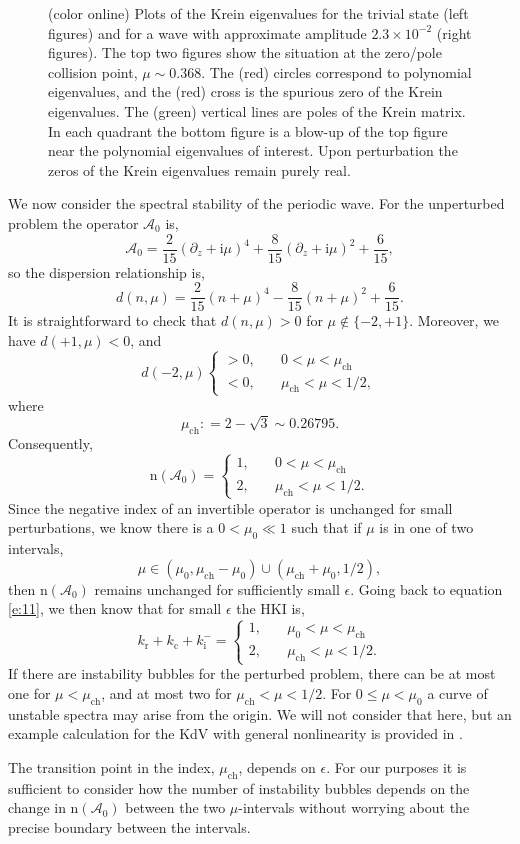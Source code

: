 \documentclass[review,onefignum,onetabnum]{siamart171218}
\def\coloneqq{\mathrel{\mathop:}=}
\newcommand{\rmc}{\mathrm{c}}
\newcommand{\rmi}{\mathrm{i}}
\newcommand{\rmn}{\mathrm{n}}
\newcommand{\rmr}{\mathrm{r}}
\newcommand{\calA}{\mathcal{A}}
\begin{document}
\begin{figure}[ht]
\begin{center}
\begin{tabular}{cc}
\end{tabular}
\caption{(color online) Plots of the Krein eigenvalues for the trivial state (left figures) and for
a wave with approximate amplitude $2.3\times10^{-2}$ (right figures). The top two figures show the
situation at the zero/pole collision
point, $\mu\sim0.368$. The (red) circles correspond to polynomial eigenvalues, and the (red) cross
is the spurious zero of the Krein eigenvalues. The (green) vertical lines are poles
of the Krein matrix. In each quadrant the bottom figure is a blow-up
of the top figure near the polynomial eigenvalues of interest. Upon perturbation the zeros of the Krein eigenvalues remain purely real.}
\label{f:KreinEvalCollide1}
\end{center}
\end{figure}

We now consider the spectral stability of the periodic wave.
For the unperturbed problem the operator $\calA_0$ is,
\[
\calA_0=\frac2{15}(\partial_z+\rmi\mu)^4+\frac8{15}(\partial_z+\rmi\mu)^2+\frac6{15},
\]
so the dispersion relationship is,
\[
d(n,\mu)=\frac2{15}(n+\mu)^4-\frac8{15}(n+\mu)^2+\frac6{15}.
\]
It is straightforward to check that $d(n,\mu)>0$ for $\mu\notin\{-2,+1\}$.
Moreover, we have $d(+1,\mu)<0$, and
\[
d(-2,\mu)\begin{cases}>0,\quad&0<\mu<\mu_{\mathrm{ch}}\\
<0,\quad&\mu_{\mathrm{ch}}<\mu<1/2,\end{cases}
\]
where
\[
\mu_{\mathrm{ch}}\coloneqq2-\sqrt{3}\sim0.26795.
\]
Consequently,
\[
\rmn(\calA_0)=\begin{cases}1,\quad&0<\mu<\mu_{\mathrm{ch}}\\
2,\quad&\mu_{\mathrm{ch}}<\mu<1/2.\end{cases}
\]
Since the negative index of an invertible operator is unchanged for small perturbations, we know there is a $0<\mu_0\ll1$ such that if $\mu$ is in one of two intervals,
\[
\mu\in\left(\mu_0,\mu_{\mathrm{ch}}-\mu_0\right)\cup
\left(\mu_{\mathrm{ch}}+\mu_0,1/2\right),
\]
then $\rmn(\calA_0)$ remains unchanged for sufficiently small $\epsilon$. Going back to equation \cref{e:11}, we then know that for small $\epsilon$ the HKI is,
\[
k_\rmr+k_\rmc+k_\rmi^-=\begin{cases}1,\quad&\mu_0<\mu<\mu_{\mathrm{ch}}\\
2,\quad&\mu_{\mathrm{ch}}<\mu<1/2.\end{cases}
\]
If there are instability bubbles for the perturbed problem, there can be at most one for $\mu<\mu_{\mathrm{ch}}$, and at most two for $\mu_{\mathrm{ch}}<\mu<1/2$. For $0\le\mu<\mu_0$ a curve of unstable spectra may arise from the origin. We will not consider that here, but an example calculation for the KdV with general nonlinearity is provided in \cite[Section~4]{haragus:ots08}.
\begin{remark}
The transition point in the index, $\mu_{\mathrm{ch}}$, depends on $\epsilon$. For our purposes it is sufficient to consider how the number of instability bubbles depends on the change in $\rmn(\calA_0)$ between the two $\mu$-intervals without worrying about the precise boundary between the intervals.
\end{remark}
\end{document}
